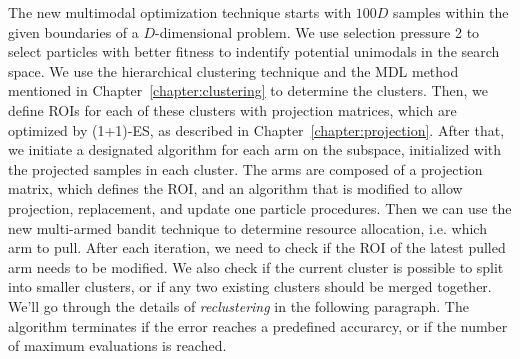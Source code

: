 The new multimodal optimization technique starts with $100D$ samples within the given boundaries of a $D$-dimensional problem.
We use selection pressure 2 to select particles with better fitness to indentify potential unimodals in the search space.
We use the hierarchical clustering technique and the MDL method mentioned in Chapter~\ref{chapter:clustering} to determine the clusters.
Then, we define ROIs for each of these clusters with projection matrices, 
which are optimized by (1+1)-ES, as described in Chapter~\ref{chapter:projection}.
After that, we initiate a designated algorithm for each arm on the subspace, initialized with the projected samples in each cluster.
The arms are composed of a projection matrix, which defines the ROI, 
and an algorithm that is modified to allow projection, replacement, and update one particle procedures.
Then we can use the new multi-armed bandit technique to determine resource allocation, i.e. which arm to pull. 
After each iteration, we need to check if the ROI of the latest pulled arm needs to be modified.
We also check if the current cluster is possible to split into smaller clusters, or if any two existing clusters should be merged together.
We'll go through the details of \textit{reclustering} in the following paragraph.
The algorithm terminates if the error reaches a predefined accurarcy, or if the number of maximum evaluations is reached.





%
%
%
%
%





